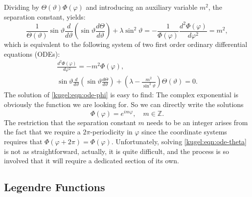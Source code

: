Dividing by $\Theta(\vartheta)\Phi(\varphi)$ and introducing an auxiliary
variable $m^2$, the separation constant, yields:
\begin{equation*}
  \frac{1}{\Theta(\vartheta)}\sin \vartheta \frac{d}{d \vartheta} \left(
    \sin \vartheta \frac{d \Theta}{d \vartheta}
  \right)
  + \lambda \sin^2 \vartheta
  = -\frac{1}{\Phi(\varphi)} \frac{d^2\Phi(\varphi)}{d\varphi^2}
  = m^2,
\end{equation*}
which is equivalent to the following system of two first order ordinary
differential equations (ODEs):
\begin{subequations}
  \begin{gather}
    \frac{d^2\Phi(\varphi)}{d\varphi^2} = -m^2 \Phi(\varphi),
      \label{kugel:eqn:ode-phi} \\ 
    \sin \vartheta \frac{d}{d \vartheta} \left(
      \sin \vartheta \frac{d \Theta}{d \vartheta}
    \right)
    + \left( \lambda - \frac{m^2}{\sin^2 \vartheta} \right)
      \Theta(\vartheta) = 0
      \label{kugel:eqn:ode-theta}.
  \end{gather}
\end{subequations}
The solution of \eqref{kugel:eqn:ode-phi} is easy to find: The complex
exponential is obviously the function we are looking for. So we can directly
write the solutions
\begin{equation} \label{kugel:eqn:ode-phi-sol}
    \Phi(\varphi) = e^{i m \varphi}, \quad m \in \mathbb{Z}.
\end{equation}
The restriction that the separation constant $m$ needs to be an integer arises
from the fact that we require a $2\pi$-periodicity in $\varphi$ since the
coordinate systems requires that $\Phi(\varphi + 2\pi) = \Phi(\varphi)$.
Unfortunately, solving \eqref{kugel:eqn:ode-theta} is not as straightforward,
actually, it is quite difficult, and the process is so involved that it will
require a dedicated section of its own.

\subsection{Legendre Functions}

